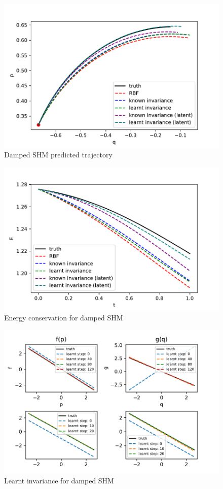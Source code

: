 \documentclass{statsmsc}
\begin{document}
\begin{figure}[H]
        \centering
        \includegraphics[width=0.8\linewidth]{../codes/figures/damped_shm_predicted.pdf}
        \caption{Damped SHM predicted trajectory}
        \label{fig:damped_shm_prediction}
\end{figure}

\begin{figure}[H] 
  \includegraphics[width=0.8\linewidth]{../codes/figures/damped_shm_energy.pdf}
  \centering
  \caption{Energy conservation for damped SHM}
  \label{fig:damped_shm_energy}
\end{figure}


\begin{figure}[H] 
  \includegraphics[width=0.8\linewidth]{../codes/figures/damped_shm_learnt_over_time.pdf}
  \centering
  \caption{Learnt invariance for damped SHM}
  \label{fig:damped_shm_learnt}
\end{figure}
\end{document}
